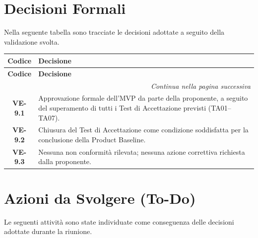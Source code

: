 \section{Decisioni Formali}
Nella seguente tabella sono tracciate le decisioni adottate a seguito
della validazione svolta.

\renewcommand{\arraystretch}{1.3}
\vspace{-0.3cm}
\noindent
\begin{longtable}{c p{12cm}}
	\toprule
	\textbf{Codice} & \textbf{Decisione} \\
	\midrule
	\endfirsthead

	\toprule
	\textbf{Codice} & \textbf{Decisione} \\
	\midrule
	\endhead

	\midrule
	\multicolumn{2}{r}{\textit{Continua nella pagina successiva}} \\
	\midrule
	\endfoot

	\bottomrule
	\endlastfoot

	\textbf{VE-9.1}
		& Approvazione formale dell'MVP da parte della proponente, a seguito del superamento di tutti i Test di Accettazione previsti (TA01--TA07). \\[4pt]

	\textbf{VE-9.2}
		& Chiusura del Test di Accettazione come condizione soddisfatta per la conclusione della Product Baseline. \\[4pt]

	\textbf{VE-9.3}
		& Nessuna non conformità rilevata; nessuna azione correttiva richiesta dalla proponente. \\[4pt]
\end{longtable}

\newpage
\section{Azioni da Svolgere (To-Do)}

Le seguenti attività sono state individuate come conseguenza
delle decisioni adottate durante la riunione.

